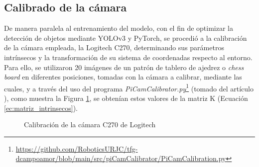\subsection{Calibrado de la cámara}
\label{sec:Calibrado_camara}

De manera paralela al entrenamiento del modelo, con el fin de optimizar la detección de objetos mediante YOLOv3 y PyTorch, se procedió a la calibración de la cámara empleada, la Logitech C270, determinando sus parámetros intrínsecos y la transformación de su sistema de coordenadas respecto al entorno. Para ello, se utilizaron 20 imágenes de un patrón de tablero de ajedrez o \textit{chess board} en diferentes posiciones, tomadas con la cámara a calibrar, mediante las cuales, y a través del uso del programa \textit{PiCamCalibrator.py}\footnote{\url{https://github.com/RoboticsURJC/tfg-dcampoamor/blob/main/src/piCamCalibrator/PiCamCalibration.py}} (tomado del artículo \cite{Vega21}), como muestra la Figura \ref{fig:calibracion_camara}, se obtenían estos valores de la matriz K (Ecuación \ref{ec:matriz_intrinsecos}). 

 \begin{figure}[H]
    \begin{center}
      \subcapcentertrue
      \hspace{2mm}
    \end{center}
    \caption{Calibración de la cámara C270 de Logitech}
    \label{fig:calibracion_camara}
  \end{figure}


